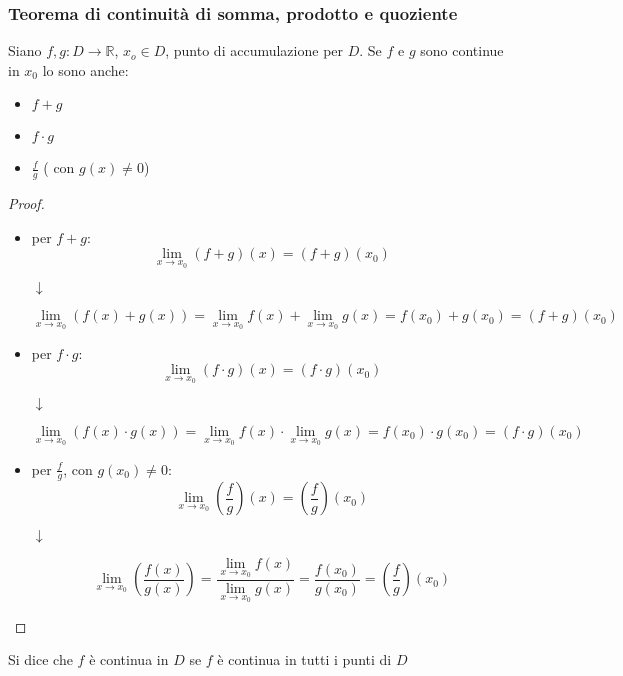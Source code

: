 \documentclass[a4paper,12pt, oneside]{book}
\begin{document}
\subsubsection{Teorema di continuità di somma, prodotto e quoziente}
\begin{teorema}
Siano $f,g:D\rightarrow \mathbb{R}$, $x_o\in D$, punto  di accumulazione per $D$. Se $f$ e $g$ sono continue in $x_0$ lo sono anche:
\begin{itemize}
\item $f+g$
\item $f\cdot g$
\item $\frac{f}{g}$ ( con $g(x)\neq 0$)
\end{itemize}
\end{teorema}
\begin{proof}
\begin{itemize}
\item per $f+g$:
$$\lim_{x\rightarrow x_0} (f+g)(x)=(f+g)(x_0)$$
\begin{center}$\downarrow$ \end{center}
$$\lim_{x\rightarrow x_0} (f(x)+g(x))=\lim_{x\rightarrow x_0} f(x)+\lim_{x\rightarrow x_0} g(x)=f(x_0)+g(x_0)=(f+g)(x_0)$$
\item per $f\cdot g$:
$$\lim_{x\rightarrow x_0} (f\cdot g)(x)=(f\cdot g)(x_0)$$
\begin{center}$\downarrow$ \end{center}
$$\lim_{x\rightarrow x_0} (f(x)\cdot g(x))=\lim_{x\rightarrow x_0} f(x)\cdot \lim_{x\rightarrow x_0} g(x)=f(x_0)\cdot g(x_0)=(f\cdot g)(x_0)$$
\item per $\frac{f}{g}$, con $g(x_0)\neq 0$:
$$\lim_{x\rightarrow x_0} \left(\frac{f}{g}\right)(x)=\left(\frac{f}{g}\right)(x_0)$$
\begin{center}$\downarrow$ \end{center}
$$\lim_{x\rightarrow x_0} \left(\frac{f(x)}{g(x)}\right)=\frac{\lim_{x\rightarrow x_0} f(x)}{\lim_{x\rightarrow x_0} g(x)}=\frac{f(x_0)}{g(x_0)}=\left(\frac{f}{g}\right)(x_0)$$
\end{itemize}
\end{proof}
\begin{definizione}
Si dice che $f$ è continua in $D$ se $f$ è continua in tutti i punti di $D$ 
\end{definizione}
\end{document}
